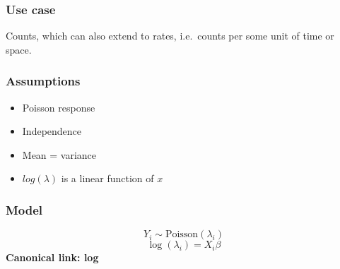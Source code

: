 \documentclass[
  openany]{book}
\providecommand{\tightlist}{%
  \setlength{\itemsep}{0pt}\setlength{\parskip}{0pt}}
\begin{document}
\hypertarget{use-case-3}{%
\subsubsection{Use case}\label{use-case-3}}

Counts, which can also extend to rates, i.e.~counts per some unit of
time or space.

\hypertarget{assumptions-4}{%
\subsubsection{Assumptions}\label{assumptions-4}}

\begin{itemize}
\tightlist
\item
  Poisson response
\item
  Independence
\item
  Mean = variance
\item
  \(log(\lambda)\) is a linear function of \(x\)
\end{itemize}

\hypertarget{model-2}{%
\subsubsection{Model}\label{model-2}}

\[Y_i \sim \text{Poisson}(\lambda_i) \] \[\log(\lambda_i) = X_i\beta\]
\textbf{Canonical link: log}
\end{document}

